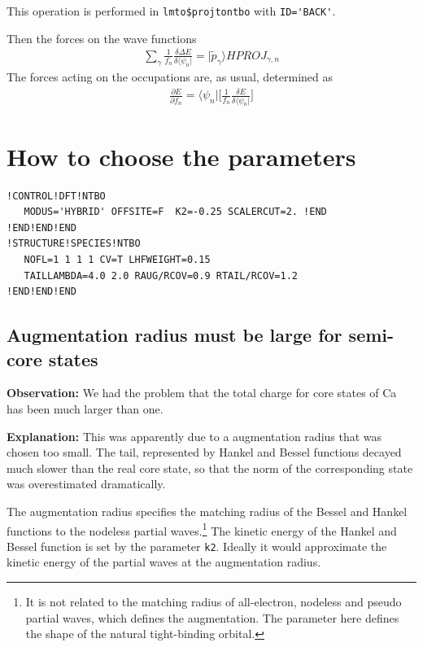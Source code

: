 \documentclass[11pt,a4paper]{report}
\begin{document}
This operation is performed in
\verb|lmto$projtontbo| with \verb|ID='BACK'|.


Then the forces on the wave functions 
\begin{eqnarray}
\sum_{\gamma}
\frac{1}{f_n}\frac{\delta \Delta E}{\delta\langle\psi_n|}
=|\tilde{p}_\gamma\rangle HPROJ_{\gamma,n}
\end{eqnarray}
The forces acting on the occupations are, as usual, determined as
\begin{eqnarray}
\frac{\partial E}{\partial f_n}=\langle\psi_n|
\biggl[
\frac{1}{f_n}\frac{\delta E}{\delta\langle\psi_n|}
\biggr]
\end{eqnarray}


\section{How to choose the parameters}
\begin{verbatim}
!CONTROL!DFT!NTBO 
   MODUS='HYBRID' OFFSITE=F  K2=-0.25 SCALERCUT=2. !END
!END!END!END
!STRUCTURE!SPECIES!NTBO    
   NOFL=1 1 1 1 CV=T LHFWEIGHT=0.15
   TAILLAMBDA=4.0 2.0 RAUG/RCOV=0.9 RTAIL/RCOV=1.2
!END!END!END
\end{verbatim}

\subsection{Augmentation radius must be large for semi-core states}
\textbf{Observation:} We had the problem that the total charge for
core states of Ca has been much larger than one.


\textbf{Explanation:} This was apparently due to a augmentation radius
that was chosen too small. The tail, represented by Hankel and Bessel
functions decayed much slower than the real core state, so that the
norm of the corresponding state was overestimated dramatically.

The augmentation radius specifies the matching radius of the Bessel
and Hankel functions to the nodeless partial waves.\footnote{It is not
  related to the matching radius of all-electron, nodeless and pseudo
  partial waves, which defines the augmentation. The parameter here
  defines the shape of the natural tight-binding orbital.} The kinetic
energy of the Hankel and Bessel function is set by the parameter
\verb|k2|. Ideally it would approximate the kinetic energy of the
partial waves at the augmentation radius.
\end{document}
